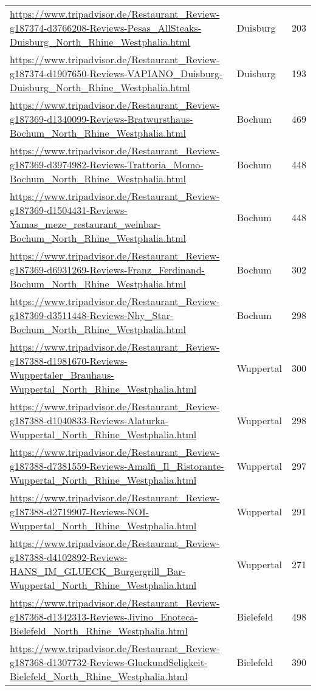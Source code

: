 \begin{table}[H]
{\begin{tabular}{llr}
\url{https://www.tripadvisor.de/Restaurant\_Review-g187374-d3766208-Reviews-Pesas\_AllSteaks-Duisburg\_North\_Rhine\_Westphalia.html} & Duisburg & 203 \\ 
\url{https://www.tripadvisor.de/Restaurant\_Review-g187374-d1907650-Reviews-VAPIANO\_Duisburg-Duisburg\_North\_Rhine\_Westphalia.html} & Duisburg & 193 \\ 
\url{https://www.tripadvisor.de/Restaurant\_Review-g187369-d1340099-Reviews-Bratwursthaus-Bochum\_North\_Rhine\_Westphalia.html} & Bochum & 469 \\ 
\url{https://www.tripadvisor.de/Restaurant\_Review-g187369-d3974982-Reviews-Trattoria\_Momo-Bochum\_North\_Rhine\_Westphalia.html} & Bochum & 448 \\ 
\url{https://www.tripadvisor.de/Restaurant\_Review-g187369-d1504431-Reviews-Yamas\_meze\_restaurant\_weinbar-Bochum\_North\_Rhine\_Westphalia.html} & Bochum & 448 \\ 
\url{https://www.tripadvisor.de/Restaurant\_Review-g187369-d6931269-Reviews-Franz\_Ferdinand-Bochum\_North\_Rhine\_Westphalia.html} & Bochum & 302 \\ 
\url{https://www.tripadvisor.de/Restaurant\_Review-g187369-d3511448-Reviews-Nhy\_Star-Bochum\_North\_Rhine\_Westphalia.html} & Bochum & 298 \\ 
\url{https://www.tripadvisor.de/Restaurant\_Review-g187388-d1981670-Reviews-Wuppertaler\_Brauhaus-Wuppertal\_North\_Rhine\_Westphalia.html} & Wuppertal & 300 \\ 
\url{https://www.tripadvisor.de/Restaurant\_Review-g187388-d1040833-Reviews-Alaturka-Wuppertal\_North\_Rhine\_Westphalia.html} & Wuppertal & 298 \\ 
\url{https://www.tripadvisor.de/Restaurant\_Review-g187388-d7381559-Reviews-Amalfi\_Il\_Ristorante-Wuppertal\_North\_Rhine\_Westphalia.html} & Wuppertal & 297 \\ 
\url{https://www.tripadvisor.de/Restaurant\_Review-g187388-d2719907-Reviews-NOI-Wuppertal\_North\_Rhine\_Westphalia.html} & Wuppertal & 291 \\ 
\url{https://www.tripadvisor.de/Restaurant\_Review-g187388-d4102892-Reviews-HANS\_IM\_GLUECK\_Burgergrill\_Bar-Wuppertal\_North\_Rhine\_Westphalia.html} & Wuppertal & 271 \\ 
\url{https://www.tripadvisor.de/Restaurant\_Review-g187368-d1342313-Reviews-Jivino\_Enoteca-Bielefeld\_North\_Rhine\_Westphalia.html} & Bielefeld & 498 \\ 
\url{https://www.tripadvisor.de/Restaurant\_Review-g187368-d1307732-Reviews-GluckundSeligkeit-Bielefeld\_North\_Rhine\_Westphalia.html} & Bielefeld & 390 \\ 

\end{tabular}}
\end{table}

